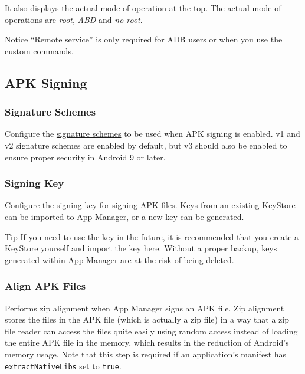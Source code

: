 It also displays the actual mode of operation at the top. The actual mode of operations are
\textit{root}, \textit{ABD} and \textit{no-root}.

\begin{tip}{Notice}
    ``Remote service'' is only required for ADB users or when you use the custom commands.
\end{tip}


\subsection{APK Signing}\label{subsec:apk-signing} %

\subsubsection{Signature Schemes} %
Configure the \href{https://source.android.com/security/apksigning}{signature schemes} to be used when APK signing is enabled.
v1 and v2 signature schemes are enabled by default, but v3 should also be enabled to ensure proper security in Android 9 or later.

\subsubsection{Signing Key} %
Configure the signing key for signing APK files. Keys from an existing KeyStore can be imported to App Manager,
or a new key can be generated.

\begin{tip}{Tip}
    If you need to use the key in the future, it is recommended that you create a KeyStore yourself
    and import the key here. Without a proper backup, keys generated within App Manager are at the risk of being deleted.
\end{tip}

\subsubsection{Align APK Files} %
Performs zip alignment when App Manager signs an APK file. Zip alignment stores the files in the APK
file (which is actually a zip file) in a way that a zip file reader can access the files quite
easily using random access instead of loading the entire APK file in the memory, which results in
the reduction of Android's memory usage. Note that this step is required if an application's
manifest has \texttt{extractNativeLibs} set to \texttt{true}.

